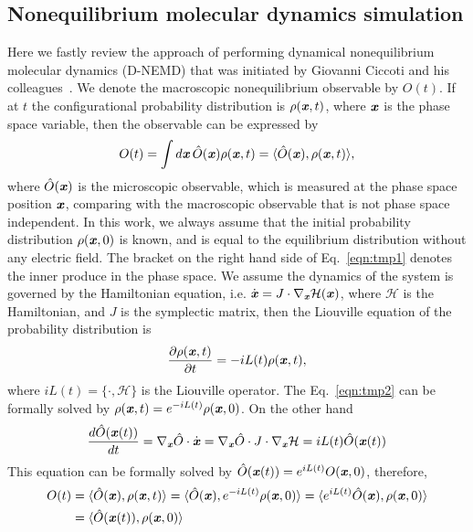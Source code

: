 \documentclass[a4paper,preprint,unsortedaddress,onecolumn]{revtex4-1}
\newcommand{\vect}[1]{\textbf{\textit{#1}}}
\begin{document}
\subsection{Nonequilibrium molecular dynamics simulation}
Here we fastly review the approach of performing dynamical nonequilibrium
molecular dynamics (D-NEMD) that was initiated by Giovanni Ciccoti and his
colleagues~\cite{ciccotti1975direct, ciccotti1979thought,
  orlandini2011hydrodynamics, orlandini2011hydrodynamics-01}.
We denote the macroscopic nonequilibrium observable by $O(t)$. If at $t$
the configurational probability distribution is $\rho(\vect x, t)$, where
$\vect x$ is the phase space variable, then the observable can be
expressed by
\begin{align}\label{eqn:tmp1}
  O(t) = \int d\vect x\, \hat O(\vect x)\rho(\vect x, t)  = \langle \hat O(\vect x), \rho(\vect x, t)\rangle,
\end{align}
where $\hat O (\vect x)$ is the microscopic observable, 
which is measured at the phase space position $\vect x$,
comparing with the macroscopic observable that is not phase space independent.
In this work, we always assume that the initial probability distribution
$\rho(\vect x, 0)$ is known, and is equal to the equilibrium distribution
without any electric field.
The bracket on the right hand side of Eq.~\eqref{eqn:tmp1} denotes the inner produce in the
phase space.  We assume the dynamics of the system is governed by the
Hamiltonian equation, i.e. $\dot {\vect x} = J \cdot \nabla_{\vect x}
\mathcal H(\vect x)$, where $\mathcal H$ is the Hamiltonian, and $J$ is
the symplectic matrix, then the Liouville equation of the probability
distribution is
\begin{align}\label{eqn:tmp2}
  \frac{\partial \rho(\vect x, t)}{\partial t} = - iL(t) \rho(\vect x, t),
\end{align}
where $iL(t) = \{\cdot, \mathcal H\}$ is the Liouville operator.
The Eq.~\eqref{eqn:tmp2}
can be formally solved by $\rho(\vect x, t) = e^{-iL(t)} \rho(\vect x, 0)$.
On the other hand
\begin{align}
  \frac{d \hat O(\vect x(t))}{dt} = \nabla_{\vect x}\hat O\cdot \dot{\vect x}
  = \nabla_{\vect x}\hat O\cdot J\cdot \nabla_{\vect x}\mathcal H
  = iL(t) \hat O (\vect x(t))
\end{align}
This equation can be formally solved by $\hat O(\vect x(t)) = e^{iL(t)} O(\vect x, 0)$, therefore,
\begin{align}\nonumber
  O(t) & = \langle \hat O(\vect x), \rho(\vect x, t)\rangle
  = \langle \hat O(\vect x), e^{-iL(t)} \rho(\vect x, 0)\rangle
  = \langle e^{iL(t)}\hat O(\vect x), \rho(\vect x, 0)\rangle\\\label{eqn:tmp4}
  &= \langle \hat O(\vect x(t)), \rho(\vect x, 0)\rangle
\end{align}
\end{document}
